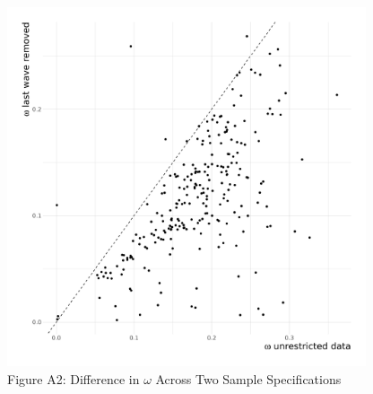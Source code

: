\documentclass[
  12pt,
]{article}
\begin{document}
\begin{figure}[tb]
\begin{center}
\caption*{Figure A2: Difference in $\omega$ Across Two Sample Specifications} 

\includegraphics[width=400px]{../figures/figure_A2}

\end{center}
\end{figure}
\end{document}
